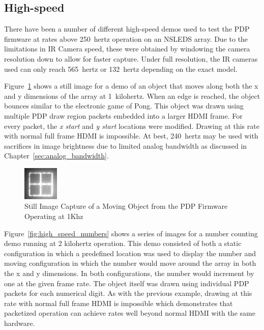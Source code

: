     \subsection{High-speed}
        There have been a number of different high-speed demos used to test the PDP firmware at rates above \mbox{250 hertz} operation on an NSLEDS array. Due to the limitations in IR Camera speed, these were obtained by windowing the camera resolution down to allow for faster capture. Under full resolution, the IR cameras used can only reach \mbox{565 hertz} or \mbox{132 hertz} depending on the exact model.

        Figure~\ref{fig:high_speed_object} shows a still image for a demo of an object that moves along both the x and y dimensions of the array at \mbox{1 kilohertz}. When an edge is reached, the object bounces similar to the electronic game of Pong\cite{Alcorn1972}. This object was drawn using multiple PDP draw region packets embedded into a larger HDMI frame. For every packet, the {\it x start} and {\it y start} locations were modified. Drawing at this rate with normal full frame HDMI is impossible. At best, \mbox{240 hertz} may be used with sacrifices in image brightness due to limited analog bandwidth as discussed in Chapter~\ref{sec:analog_bandwidth}.

        \begin{figure}[t]
            \centering
            \includegraphics[width=0.15\textwidth]{fig/high_speed_object.png}
            \caption{Still Image Capture of a Moving Object from the PDP Firmware Operating at 1Khz}
            \label{fig:high_speed_object}
        \end{figure}

        Figure~\ref{fig:high_speed_numbers} shows a series of images for a number counting demo running at {2 kilohertz} operation. This demo consisted of both a static configuration in which a predefined location was used to display the number and moving configuration in which the number would move around the array in both the x and y dimensions. In both configurations, the number would increment by one at the given frame rate. The object itself was drawn using individual PDP packets for each numerical digit. As with the previous example, drawing at this rate with normal full frame HDMI is impossible which demonstrates that packetized operation can achieve rates well beyond normal HDMI with the same hardware.

